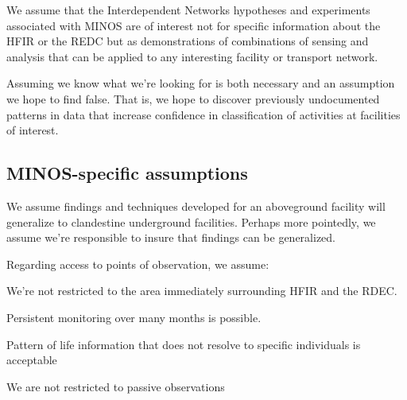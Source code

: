 \documentclass{article} %
\begin{document}
We assume that the Interdependent Networks hypotheses and experiments associated with MINOS are of interest not for specific information about the HFIR or the REDC but as demonstrations of combinations of sensing and analysis that can be applied to any interesting facility or transport network.

Assuming we know what we're looking for is both necessary and an assumption we hope to find false. That is, we hope to discover previously undocumented patterns in data that increase confidence in classification of activities at facilities of interest. 

\subsection{MINOS-specific assumptions}
We assume findings and techniques developed for an aboveground facility will generalize to clandestine underground facilities. Perhaps more pointedly, we assume we're responsible to insure that findings can be generalized.

Regarding access to points of observation, we assume:
\begin{itemize*}
\item We're not restricted to the area immediately surrounding HFIR and the RDEC.
\item Persistent monitoring over many months is possible.
\item Pattern of life information that does not resolve to specific individuals is acceptable
\item We are not restricted to passive observations
\end{itemize*}
\end{document}
